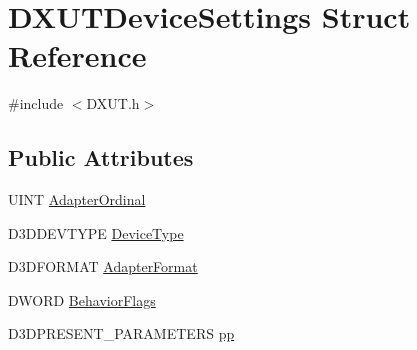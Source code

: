 \hypertarget{struct_d_x_u_t_device_settings}{
\section{DXUTDeviceSettings Struct Reference}
\label{struct_d_x_u_t_device_settings}
}


{\ttfamily \#include $<$DXUT.h$>$}\subsection*{Public Attributes}
\begin{DoxyCompactItemize}
\item 
UINT \hyperlink{struct_d_x_u_t_device_settings_ac00ec64bb226ee683c4e3554a6835933}{AdapterOrdinal}
\item 
D3DDEVTYPE \hyperlink{struct_d_x_u_t_device_settings_a9dc10f7cf1c3de20e74b137972c38247}{DeviceType}
\item 
D3DFORMAT \hyperlink{struct_d_x_u_t_device_settings_a78f577a8d78ad427fac4f833bc1c1bb4}{AdapterFormat}
\item 
DWORD \hyperlink{struct_d_x_u_t_device_settings_a69d3a37b13d31c063036c25d893f7def}{BehaviorFlags}
\item 
D3DPRESENT\_\-PARAMETERS \hyperlink{struct_d_x_u_t_device_settings_acb5b0e659eeb53c48323cb23bc057240}{pp}
\end{DoxyCompactItemize}


